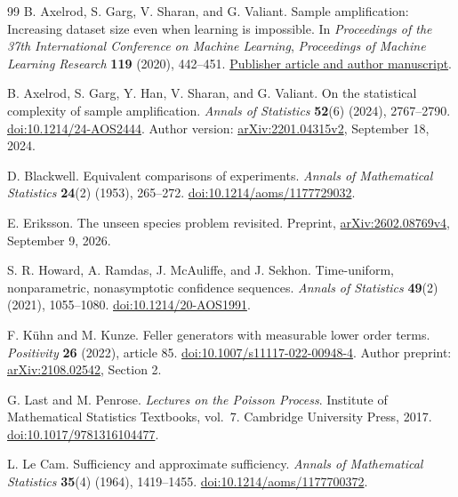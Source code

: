 \documentclass[11pt]{article}
\numberwithin{equation}{section}
\theoremstyle{definition}
\theoremstyle{remark}
\begin{document}
\begingroup\small
\begin{thebibliography}{99}
\setlength{\itemsep}{3pt}
B. Axelrod, S. Garg, V. Sharan, and G. Valiant.
Sample amplification: Increasing dataset size even when learning is impossible.
In \emph{Proceedings of the 37th International Conference on Machine Learning},
\emph{Proceedings of Machine Learning Research} \textbf{119} (2020), 442--451.
\href{https://proceedings.mlr.press/v119/axelrod20a.html}{Publisher article and author manuscript}.

B. Axelrod, S. Garg, Y. Han, V. Sharan, and G. Valiant.
On the statistical complexity of sample amplification.
\emph{Annals of Statistics} \textbf{52}(6) (2024), 2767--2790.
\href{https://doi.org/10.1214/24-AOS2444}{doi:10.1214/24-AOS2444}.
Author version: \href{https://arxiv.org/abs/2201.04315v2}{arXiv:2201.04315v2}, September 18, 2024.

D. Blackwell. Equivalent comparisons of experiments.
\emph{Annals of Mathematical Statistics} \textbf{24}(2) (1953), 265--272.
\href{https://doi.org/10.1214/aoms/1177729032}{doi:10.1214/aoms/1177729032}.

E. Eriksson. The unseen species problem revisited.
Preprint, \href{https://arxiv.org/abs/2602.08769v4}{arXiv:2602.08769v4}, September 9, 2026.

S. R. Howard, A. Ramdas, J. McAuliffe, and J. Sekhon.
Time-uniform, nonparametric, nonasymptotic confidence sequences.
\emph{Annals of Statistics} \textbf{49}(2) (2021), 1055--1080.
\href{https://doi.org/10.1214/20-AOS1991}{doi:10.1214/20-AOS1991}.

F. K\"uhn and M. Kunze. Feller generators with measurable lower order terms.
\emph{Positivity} \textbf{26} (2022), article 85.
\href{https://doi.org/10.1007/s11117-022-00948-4}{doi:10.1007/s11117-022-00948-4}.
Author preprint: \href{https://arxiv.org/abs/2108.02542}{arXiv:2108.02542}, Section 2.

G. Last and M. Penrose. \emph{Lectures on the Poisson Process}.
Institute of Mathematical Statistics Textbooks, vol.\ 7. Cambridge University Press, 2017.
\href{https://doi.org/10.1017/9781316104477}{doi:10.1017/9781316104477}.

L. Le Cam. Sufficiency and approximate sufficiency.
\emph{Annals of Mathematical Statistics} \textbf{35}(4) (1964), 1419--1455.
\href{https://doi.org/10.1214/aoms/1177700372}{doi:10.1214/aoms/1177700372}.


\end{thebibliography}
\end{document}
